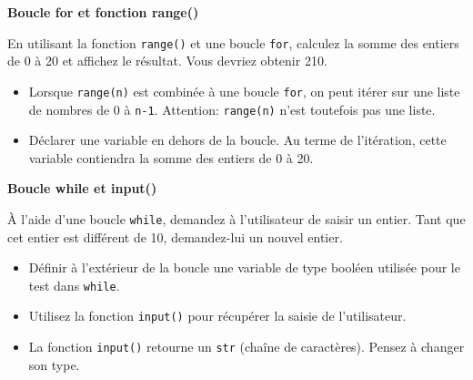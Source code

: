     \begin{Exercice}[5 minutes] [Python] \textbf{Boucle for et fonction range()}
      	
      	En utilisant la fonction \lstinline{range()} et une boucle \lstinline{for}, calculez la somme des entiers de 0 à 20 et affichez le résultat. Vous devriez obtenir 210. 
    
        \begin{conseil}
           \begin{itemize}
           	\item Lorsque \lstinline{range(n)} est combinée à une boucle \lstinline{for}, on peut itérer sur une liste de nombres de 0 à \texttt{n-1}. Attention: \lstinline{range(n)} n'est toutefois pas une liste.
           	\item Déclarer une variable en dehors de la boucle. Au terme de l'itération, cette variable contiendra la somme des entiers de 0 à 20.
           \end{itemize}
		     
        \end{conseil}
        
        \begin{solution}
            
        \end{solution}
    \end{Exercice}

    
 \begin{Exercice}[10 minutes] [Python] \textbf{Boucle while et input()}
      	
      	À l'aide d'une boucle \lstinline{while}, demandez à l'utilisateur de saisir un entier. Tant que cet entier est différent de 10, demandez-lui un nouvel entier.
    
        \begin{conseil}
           \begin{itemize}
           	\item Définir à l'extérieur de la boucle une variable de type booléen utilisée pour le test dans \lstinline{while}.
           	\item Utilisez la fonction \lstinline{input()} pour récupérer la saisie de l'utilisateur.
           	\item La fonction \lstinline{input()} retourne un \lstinline{str} (chaîne de caractères). Pensez à changer son type.
           \end{itemize}
		     
        \end{conseil}
        
        \begin{solution}
            
        \end{solution}
    \end{Exercice}


